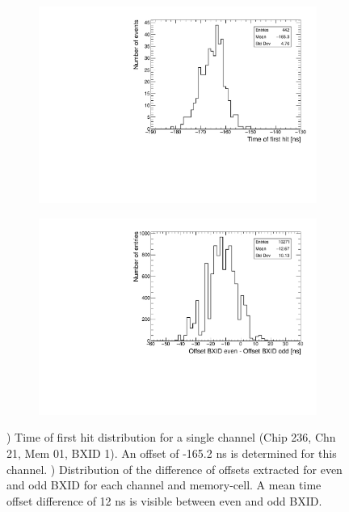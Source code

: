 \begin{figure}[htbp!]
	\begin{subfigure}[t]{0.5\textwidth}
		\centering
		\includegraphics[width=1\textwidth]{../Thesis_Plots/Timing/Muons/Plots/Timing_Chip236_Chn21_Mem01_BXID1_withOffset.pdf}
		\caption{}\label{fig:TimeChnwithOffset}
	\end{subfigure}
	\hfill
	\begin{subfigure}[t]{0.5\textwidth}
		\centering
		\includegraphics[width=1\textwidth]{../Thesis_Plots/Timing/Muons/Plots/BXIDDifferenceOffsets.pdf}
		\caption{}\label{fig:BXID_offset}
	\end{subfigure}
	\caption{) Time of first hit distribution for a single channel (Chip 236, Chn 21, Mem 01, BXID 1). An offset of -165.2 ns is determined for this channel. ) Distribution of the difference of offsets extracted for even and odd BXID for each channel and memory-cell. A mean time offset difference of 12 ns is visible between even and odd BXID.}
\end{figure}


